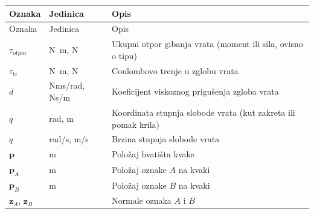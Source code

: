 \footnotesize
\renewcommand{\arraystretch}{1.5}
\begin{longtable}{@{}p{}p{}p{}@{}}
    \toprule
    Oznaka                             & Jedinica                         & Opis                                                                                            \\
    \midrule
    \endfirsthead
    \toprule
    Oznaka                             & Jedinica                         & Opis                                                                                            \\
    \midrule
    \endhead
    $\tau_{\mathrm{otpor}}$            & \si{\newton\metre}, \si{\newton} & Ukupni otpor gibanja vrata (moment ili sila, ovisno o tipu)                                     \\
    $\tau_{\mathrm{tr}}$               & \si{\newton\metre}, \si{\newton} & Coulombovo trenje u zglobu vrata                                                                \\
    $d$                                & Nms/rad, Ns/m                    & Koeficijent viskoznog prigušenja zgloba vrata                                                   \\
    $q$                                & rad, m                           & Koordinata stupnja slobode vrata (kut zakreta ili pomak krila)                                  \\
    $\dot{q}$                          & rad/s, m/s                       & Brzina stupnja slobode vrata                                                                    \\
    $\bm{p}$                           & m                                & Položaj hvatišta kvake                                                                          \\
    $\bm{p}_A$                         & m                                & Položaj oznake $A$ na kvaki                                                                     \\
    $\bm{p}_B$                         & m                                & Položaj oznake $B$ na kvaki                                                                     \\
    $\bm{z}_A$, $\bm{z}_B$             &                                  & Normale oznaka $A$ i $B$                                                                        \\

\end{longtable}
